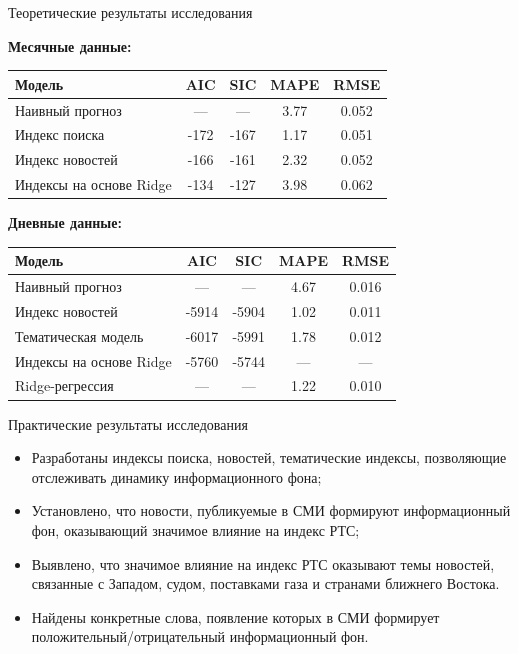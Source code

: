 \documentclass[c, dvipsnames]{beamer}  %
\begin{document}
\begin{frame}{Теоретические результаты исследования}

\hspace{1.8cm}  {\color{ex1}  \textbf{Месячные данные:}}

\begin{center}
	{\scriptsize
		\begin{tabular}{lcccc}
	\toprule
	Модель  & AIC & SIC & MAPE   & RMSE    \\
	\midrule
	Наивный прогноз           & ---  & ---     & 3.77 & 0.052    \\
	Индекс поиска               & -172 & -167 &  1.17  &  0.051  \\
	Индекс новостей            & -166 & -161 & 2.32 & 0.052  \\  
	Индексы на основе Ridge& -134 & -127 &   3.98 &  0.062  \\ 
	\bottomrule
\end{tabular}
	}
\end{center}

\hspace{1.8cm}  {\color{ex1}  \textbf{Дневные данные:}}

\begin{center}
	{\scriptsize
\begin{tabular}{lcccc}
	\toprule
	Модель  & AIC & SIC & MAPE   & RMSE    \\
	\midrule
	Наивный прогноз           & ---       & ---        & 4.67 & 0.016  \\
	Индекс новостей            & -5914 & -5904  &  1.02 & 0.011   \\  
	Тематическая модель    & -6017 & -5991   & 1.78 &   0.012 \\
	Индексы на основе Ridge&  -5760   & -5744  & --- &  ---  \\
	Ridge-регрессия              & ---      & ---  & 1.22 & 0.010 \\
	\bottomrule
\end{tabular}
	}
\end{center}


\end{frame}


\begin{frame}{Практические результаты исследования}
\begin{itemize}
	\item  Разработаны индексы поиска, новостей, тематические индексы, позволяющие отслеживать динамику информационного фона;
	\item  Установлено, что новости, публикуемые в СМИ формируют информационный фон, оказывающий значимое влияние на индекс РТС;
	\item  Выявлено, что  значимое влияние на индекс РТС оказывают темы новостей, связанные с Западом, судом, поставками газа и странами ближнего Востока.
	\item  Найдены конкретные слова, появление которых в СМИ формирует положительный/отрицательный информационный фон.
\end{itemize}
\end{frame}
\end{document}
